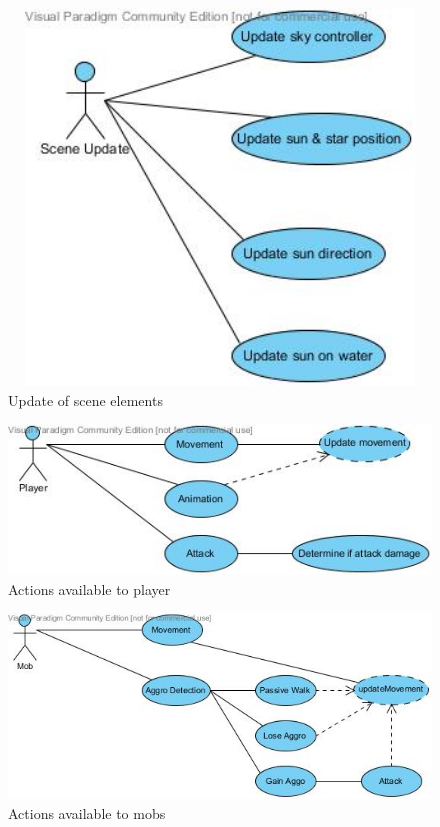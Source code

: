 \documentclass[letterpaper]{article}
\begin{document}
					\begin{figure}[H]
					\centering
					\includegraphics[width=140mm, height=100mm]{UML_Diagram/Use_Case/Update_Scene.jpg}
					\caption{Update of scene elements}
					\end{figure}
					
					\begin{figure}[H]
					\centering
					\includegraphics[width=140mm]{UML_Diagram/Use_Case/Player_Actions.jpg}
					\caption{Actions available to player}
					\end{figure}
					
					\begin{figure}[H]
					\centering
					\includegraphics[width=140mm]{UML_Diagram/Use_Case/Mob_Actions.jpg}
					\caption{Actions available to mobs}
					\end{figure}
					
\end{document}
